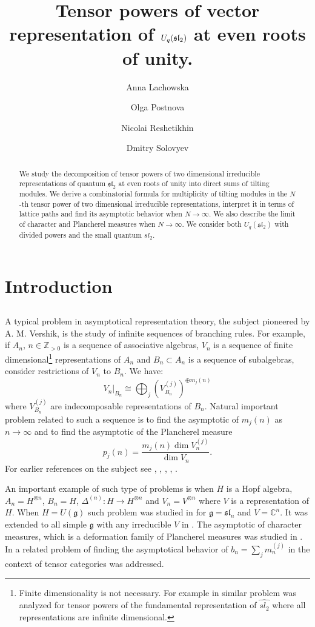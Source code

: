 \documentclass[11pt]{amsart}
\title[Tensor powers]{Tensor powers of vector representation of $U_q(\mathfrak{sl}_2)$ at even roots of unity.}
\author{Anna Lachowska}
\author{Olga Postnova}
\author{Nicolai Reshetikhin}
\author{Dmitry Solovyev}
\begin{document}

\maketitle

\begin{abstract}
We study the decomposition of tensor powers of two dimensional irreducible representations of quantum $\mathfrak{sl}_2$ at even roots of unity into direct sums of tilting modules. We derive a combinatorial formula for multiplicity of tilting modules in the $N$-th tensor power of two dimensional irreducible representations, interpret it in terms of lattice paths and find its asymptotic behavior when $N\to\infty$. We also describe the limit of character and Plancherel measures when $N\to\infty$. We consider both $U_q(\mathfrak{sl}_2)$ with divided powers and the small quantum $sl_2$.
\end{abstract}

\tableofcontents

\section{Introduction} 
\subsection{} A typical problem in asymptotical representation theory, the subject pioneered by A. M. Vershik, is the study of infinite sequences of branching rules. For example, if $A_n$, $n\in\mathbb{Z}_{>0}$ is a sequence of associative algebras, $V_n$ is a sequence of finite dimensional\footnote{Finite dimensionality is not necessary. For example in \cite{F} similar problem was analyzed for tensor powers of the fundamental representation of $\hat{sl_2}$ where all representations are infinite dimensional.} representations of $A_n$ and $B_n\subset A_n$ is a sequence of subalgebras, consider restrictions of $V_n$ to $B_n$. We have:
$$
V_n\lvert_{B_n}\cong\bigoplus_j \left(V^{(j)}_{B_n}\right)^{\oplus m_j(n)}
$$
where $V^{(j)}_{B_n}$ are indecomposable representations of $B_n$. Natural important problem related to such a sequence is to find the asymptotic of $m_j(n)$ as $n\to\infty$ and to find the asymptotic of the Plancherel measure
$$
p_j(n)=\frac{m_j(n)\dim V^{(j)}_n}{\dim V_n}.
$$
For earlier references on the subject see \cite{VK}, \cite{LS}, \cite{K}, \cite{B}, \cite{TZ}.


An important example of such type of problems is when $H$ is a Hopf algebra, $A_n=H^{\otimes n}$, $B_n=H$, $\Delta^{(n)}:H\to H^{\otimes n}$ and $V_n=V^{\otimes n}$ where $V$ is a representation of $H$. When $H=U(\mathfrak{g})$ such problem was studied in \cite{K} for $\mathfrak{g}=\mathfrak{sl}_n$ and $V=\mathbb{C}^n$. It was extended to all simple $\mathfrak{g}$ with any irreducible $V$ in \cite{B} \cite{TZ}. The asymptotic of character measures, which is a deformation family of Plancherel measures was studied in \cite{PR1} \cite{PR2}. In \cite{CEO} a related problem of finding the asymptotical behavior of $b_n=\sum_j m^{(j)}_n$ in the context of tensor categories was addressed.
\end{document}
